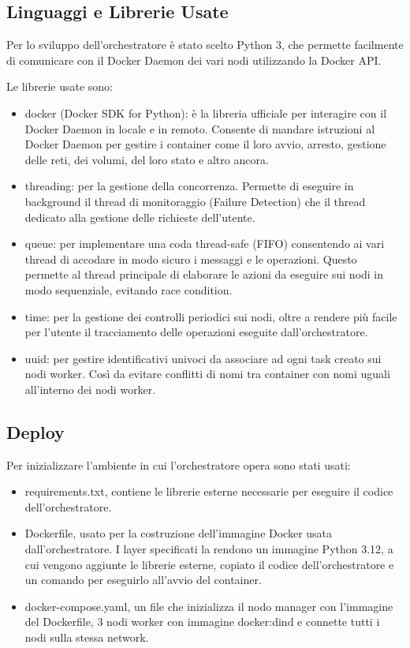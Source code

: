 \documentclass[12pt,a4paper]{article}
\begin{document}
\subsection{Linguaggi e Librerie Usate}
Per lo sviluppo dell'orchestratore è stato scelto Python 3, che permette facilmente di comunicare con il Docker Daemon dei vari nodi utilizzando la Docker API.

Le librerie usate sono:
\begin{itemize}
    \item docker (Docker SDK for Python): è la libreria ufficiale per interagire con il Docker Daemon in locale e in remoto. Consente di mandare istruzioni al Docker Daemon per gestire i container come il loro avvio, arresto, gestione delle reti, dei volumi, del loro stato e altro ancora.
    \item threading: per la gestione della concorrenza. Permette di eseguire in background il thread di monitoraggio (Failure Detection) che il thread dedicato alla gestione delle richieste dell'utente.
    \item queue: per implementare una coda thread-safe (FIFO) consentendo ai vari thread di accodare in modo sicuro i messaggi e le operazioni. Questo permette al thread principale di elaborare le azioni da eseguire sui nodi in modo sequenziale, evitando race condition.
    \item time: per la gestione dei controlli periodici sui nodi, oltre a rendere più facile per l'utente il tracciamento delle operazioni eseguite dall'orchestratore.
    \item uuid: per gestire identificativi univoci da associare ad ogni task creato sui nodi worker. Così da evitare conflitti di nomi tra container con nomi uguali all'interno dei nodi worker.
\end{itemize}

\subsection{Deploy}
Per inizializzare l'ambiente in cui l'orchestratore opera sono stati usati:
\begin{itemize}
    \item requirements.txt, contiene le librerie esterne necessarie per eseguire il codice dell'orchestratore.
    \item Dockerfile, usato per la costruzione dell'immagine Docker usata dall'orchestratore. I layer specificati la rendono un immagine Python 3.12, a cui vengono aggiunte le librerie esterne, copiato il codice dell'orchestratore e un comando per eseguirlo all'avvio del container.
    \item docker-compose.yaml, un file che inizializza il nodo manager con l'immagine del Dockerfile, 3 nodi worker con immagine docker:dind e connette tutti i nodi sulla stessa network.
\end{itemize}
\newpage
\end{document}
